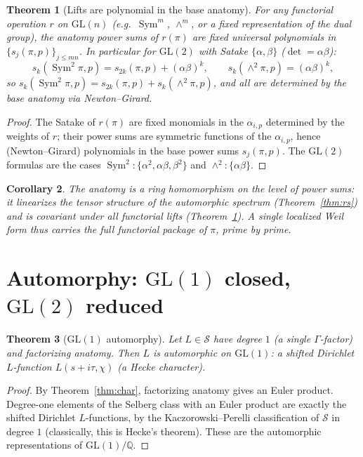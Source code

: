 \documentclass[11pt]{amsart}
\newtheorem{theorem}{Theorem}[section]
\newtheorem{corollary}[theorem]{Corollary}
\theoremstyle{definition}
\theoremstyle{remark}
\newcommand{\cS}{\mathcal S}
\newcommand{\GL}{\mathrm{GL}}
\DeclareMathOperator{\Sym}{Sym}
\begin{document}
\begin{theorem}[Lifts are polynomial in the base anatomy]\label{thm:lift}
For any functorial operation $r$ on $\GL(n)$ (e.g.\ $\Sym^m$, $\wedge^m$, or a
fixed representation of the dual group), the anatomy power sums of $r(\pi)$ are
fixed universal polynomials in $\{s_j(\pi,p)\}_{j\le mn}$. In particular for
$\GL(2)$ with Satake $\{\alpha,\beta\}$ ($\det=\alpha\beta$):
\[
s_k(\Sym^2\pi,p)=s_{2k}(\pi,p)+(\alpha\beta)^k,\qquad
s_k(\wedge^2\pi,p)=(\alpha\beta)^k,
\]
so $s_k(\Sym^2\pi,p)=s_{2k}(\pi,p)+s_k(\wedge^2\pi,p)$, and all are determined by
the base anatomy via Newton--Girard.
\end{theorem}
\begin{proof}
The Satake of $r(\pi)$ are fixed monomials in the $\alpha_{i,p}$ determined by the
weights of $r$; their power sums are symmetric functions of the $\alpha_{i,p}$,
hence (Newton--Girard) polynomials in the base power sums $s_j(\pi,p)$. The
$\GL(2)$ formulas are the cases $\Sym^2\colon\{\alpha^2,\alpha\beta,\beta^2\}$ and
$\wedge^2\colon\{\alpha\beta\}$.
\end{proof}

\begin{corollary}
The anatomy is a ring homomorphism on the level of power sums: it linearizes the
tensor structure of the automorphic spectrum (Theorem~\ref{thm:rs}) and is
covariant under all functorial lifts (Theorem~\ref{thm:lift}). A single localized
Weil form thus carries the full functorial package of $\pi$, prime by prime.
\end{corollary}

\section{Automorphy: $\GL(1)$ closed, $\GL(2)$ reduced}\label{sec:auto2}
\label{sec:auto}
\begin{theorem}[$\GL(1)$ automorphy]\label{thm:gl1}
Let $L\in\cS$ have degree $1$ (a single $\Gamma$-factor) and factorizing anatomy.
Then $L$ is automorphic on $\GL(1)$: a shifted Dirichlet $L$-function
$L(s+i\tau,\chi)$ (a Hecke character).
\end{theorem}
\begin{proof}
By Theorem~\ref{thm:char}, factorizing anatomy gives an Euler product. Degree-one
elements of the Selberg class with an Euler product are exactly the shifted
Dirichlet $L$-functions, by the Kaczorowski--Perelli classification of $\cS$ in
degree $1$ (classically, this is Hecke's theorem). These are the automorphic
representations of $\GL(1)/\mathbb Q$.
\end{proof}
\end{document}
